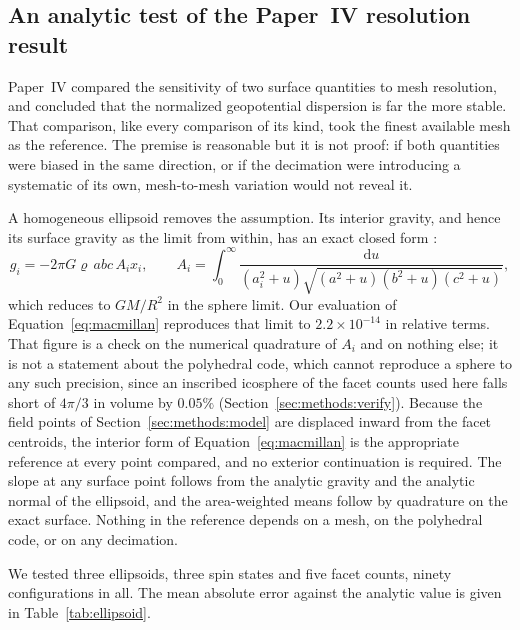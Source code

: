 \subsection{An analytic test of the Paper~IV resolution result}
\label{sec:discussion:ellipsoid}

Paper~IV compared the sensitivity of two surface quantities to mesh
resolution, and concluded that the normalized geopotential dispersion is far
the more stable. That comparison, like every comparison of its kind, took the
finest available mesh as the reference. The premise is reasonable but it is
not proof: if both quantities were biased in the same direction, or if the
decimation were introducing a systematic of its own, mesh-to-mesh variation
would not reveal it.

A homogeneous ellipsoid removes the assumption. Its interior gravity, and
hence its surface gravity as the limit from within, has an exact closed form
\citep{macmillan1930}:
%
\begin{equation}
g_i = -2\pi G \varrho\, abc\, A_i x_i , \qquad
A_i = \int_0^\infty \frac{\mathrm{d}u}
     {(a_i^2+u)\sqrt{(a^2+u)(b^2+u)(c^2+u)}} ,
\label{eq:macmillan}
\end{equation}
%
which reduces to $GM/R^{2}$ in the sphere limit. Our evaluation of
Equation~\eqref{eq:macmillan} reproduces that limit to $2.2\times10^{-14}$
in relative terms. That figure is a check on the numerical quadrature of
$A_i$ and on nothing else; it is not a statement about the polyhedral code,
which cannot reproduce a sphere to any such precision, since an inscribed
icosphere of the facet counts used here falls short of $4\pi/3$ in volume by
$0.05\%$ (Section~\ref{sec:methods:verify}). Because the field points of
Section~\ref{sec:methods:model} are displaced inward from the facet
centroids, the interior form of Equation~\eqref{eq:macmillan} is the
appropriate reference at every point compared, and no exterior continuation
is required. The slope at any surface point follows from the analytic gravity
and the analytic normal of the ellipsoid, and the area-weighted means follow
by quadrature on the exact surface. Nothing in the reference depends on a
mesh, on the polyhedral code, or on any decimation.

We tested three ellipsoids, three spin states and five facet counts, ninety
configurations in all. The mean absolute error against the analytic value is
given in Table~\ref{tab:ellipsoid}.

